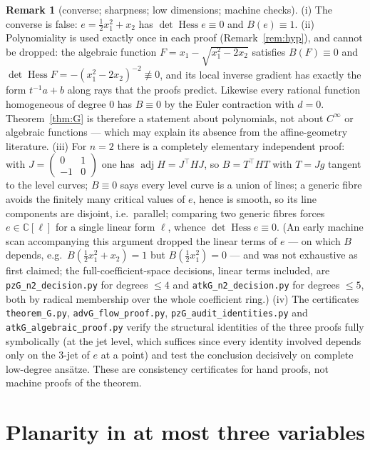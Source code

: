 \documentclass[11pt]{article}
\theoremstyle{plain}
\theoremstyle{definition}
\newtheorem{remark}[theorem]{Remark}
\newcommand{\C}{\mathbb{C}}
\newcommand{\Hess}{\operatorname{Hess}}
\newcommand{\adj}{\operatorname{adj}}
\begin{document}
\begin{remark}[converse; sharpness; low dimensions; machine
checks]\label{rem:conv}
(i) The converse is false: $e=\tfrac12x_1^2+x_2$ has $\det\Hess
e\equiv0$ and $B(e)\equiv1$.
(ii) Polynomiality is used exactly once in each proof
(Remark~\ref{rem:hyp}), and cannot be dropped: the algebraic function
$F=x_1-\sqrt{x_1^2-2x_2}$ satisfies $B(F)\equiv0$ and
$\det\Hess F=-(x_1^2-2x_2)^{-2}\not\equiv0$, and its local inverse
gradient has exactly the form $t^{-1}a+b$ along rays that the proofs
predict. Likewise every rational function homogeneous of degree $0$ has
$B\equiv0$ by the Euler contraction with $d=0$. Theorem~\ref{thm:G} is
therefore a statement about polynomials, not about $C^\infty$ or
algebraic functions --- which may explain its absence from the
affine-geometry literature.
(iii) For $n=2$ there is a completely elementary independent proof: with
$J=\left(\begin{smallmatrix}0&1\\-1&0\end{smallmatrix}\right)$ one has
$\adj H=J^{\top}HJ$, so $B=T^{\top}HT$ with $T=Jg$ tangent to the level
curves; $B\equiv0$ says every level curve is a union of lines; a generic
fibre avoids the finitely many critical values of $e$, hence is smooth,
so its line components are disjoint, i.e.\ parallel; comparing two
generic fibres forces $e\in\C[\ell]$ for a single linear form $\ell$,
whence $\det\Hess e\equiv0$. (An early machine scan accompanying this
argument dropped the linear terms of $e$ --- on which $B$ depends, e.g.\
$B(\tfrac12x_1^2+x_2)=1$ but $B(\tfrac12x_1^2)=0$ --- and was not
exhaustive as first claimed; the full-coefficient-space decisions, linear
terms included, are \texttt{pzG\_n2\_decision.py} for degrees $\le4$ and
\texttt{atkG\_n2\_decision.py} for degrees $\le5$, both by radical
membership over the whole coefficient ring.)
(iv) The certificates \texttt{theorem\_G.py}, \texttt{advG\_flow\_proof.py},
\texttt{pzG\_audit\_identities.py} and
\texttt{atkG\_algebraic\_proof.py} verify the structural identities of the
three proofs fully symbolically (at the jet level, which suffices since
every identity involved depends only on the $3$-jet of $e$ at a point)
and test the conclusion decisively on complete low-degree ans\"atze.
These are consistency certificates for hand proofs, not machine proofs
of the theorem.
\end{remark}

\section{Planarity in at most three variables}\label{sec:planar}
\end{document}
